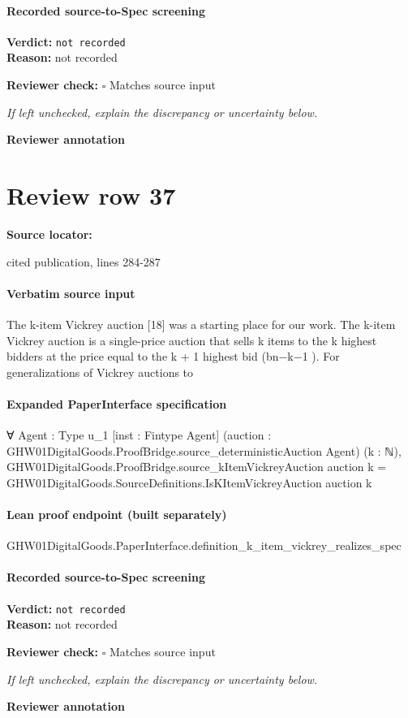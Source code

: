 \documentclass[10pt]{article}
\newcommand{\reviewerbox}{%
  \par\noindent\fbox{\parbox{0.96\linewidth}{\rule{0pt}{0.38in}}}\par
}
\newcommand{\reviewmatch}[1]{%
  \par\noindent\textbf{Reviewer check:} $\square$\; #1\par
  \noindent\emph{If left unchecked, explain the discrepancy or uncertainty below.}\par
}
\begin{document}
\paragraph{Recorded source-to-Spec screening}
\textbf{Verdict:} \texttt{not recorded}
\\
\textbf{Reason:} not recorded
\reviewmatch{Matches source input}
\noindent\textbf{Reviewer annotation}\par
\reviewerbox
\clearpage
\hypertarget{source-claim-c2c1b6c0e860a69c}{}
\section*{Review row 37}
\textbf{Source locator:} {\footnotesize\raggedright cited publication, lines 284-\allowbreak{}287\par}
\paragraph{Verbatim source input}
\begin{ReviewVerbatim}
The k-item Vickrey auction [18] was a starting
place for our work. The k-item Vickrey auction is a
single-price auction that sells k items to the k highest bidders at the price equal to the k + 1 highest bid
(bn−k−1 ). For generalizations of Vickrey auctions to
\end{ReviewVerbatim}


\paragraph{Expanded PaperInterface specification}
\begin{ReviewVerbatim}
∀ {Agent : Type u_1} [inst : Fintype Agent] (auction : GHW01DigitalGoods.ProofBridge.source_deterministicAuction Agent)
  (k : ℕ),
  GHW01DigitalGoods.ProofBridge.source_kItemVickreyAuction auction k =
    GHW01DigitalGoods.SourceDefinitions.IsKItemVickreyAuction auction k
\end{ReviewVerbatim}

\paragraph{Lean proof endpoint (built separately)}\begin{ReviewVerbatim}
GHW01DigitalGoods.PaperInterface.definition_k_item_vickrey_realizes_spec
\end{ReviewVerbatim}

\paragraph{Recorded source-to-Spec screening}
\textbf{Verdict:} \texttt{not recorded}
\\
\textbf{Reason:} not recorded
\reviewmatch{Matches source input}
\noindent\textbf{Reviewer annotation}\par
\reviewerbox
\clearpage
\hypertarget{source-claim-60e5eee461d50443}{}
\end{document}
